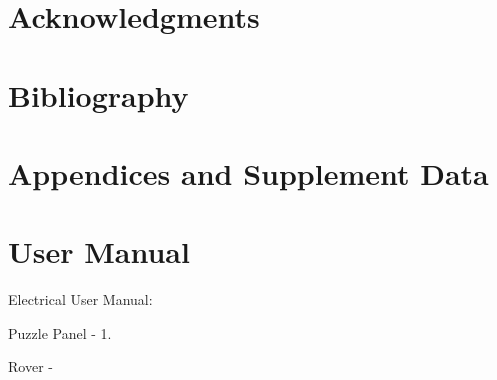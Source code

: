 \documentclass[a4paper, 10pt]{article}
\begin{document}
\section{Acknowledgments}

\section{Bibliography} 

\section{Appendices and Supplement Data}  

\section{User Manual}

Electrical User Manual:

Puzzle Panel - 1. 

Rover - 
\end{document}
